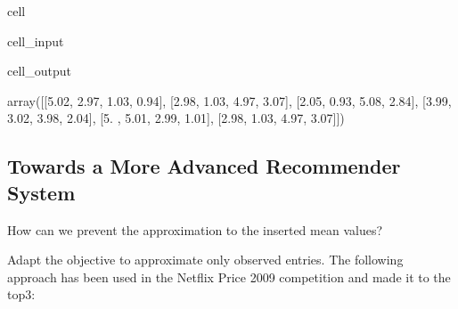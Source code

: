 \documentclass[letterpaper,10pt,english]{jupyterBook}
\begin{document}
\begin{sphinxuseclass}{cell}\begin{sphinxVerbatimInput}

\begin{sphinxuseclass}{cell_input}
\begin{sphinxVerbatim}[commandchars=\\\{\}]
\end{sphinxVerbatim}

\end{sphinxuseclass}\end{sphinxVerbatimInput}
\begin{sphinxVerbatimOutput}

\begin{sphinxuseclass}{cell_output}
\begin{sphinxVerbatim}[commandchars=\\\{\}]
array([[5.02, 2.97, 1.03, 0.94],
       [2.98, 1.03, 4.97, 3.07],
       [2.05, 0.93, 5.08, 2.84],
       [3.99, 3.02, 3.98, 2.04],
       [5.  , 5.01, 2.99, 1.01],
       [2.98, 1.03, 4.97, 3.07]])
\end{sphinxVerbatim}

\end{sphinxuseclass}\end{sphinxVerbatimOutput}

\end{sphinxuseclass}

\subsection{Towards a More Advanced Recommender System}
\label{\detokenize{dim_reduction_mf:towards-a-more-advanced-recommender-system}}
\sphinxAtStartPar
How can we prevent the approximation to the inserted mean values?

\sphinxAtStartPar
Adapt the objective to approximate only observed entries.
The following approach has been used in the Netflix Price 2009 competition and made it to the top\sphinxhyphen{}3:
\end{document}
